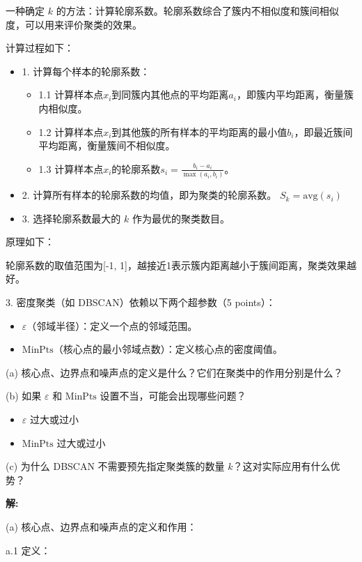 \documentclass[8pt]{article}
\begin{document}
一种确定 \( k \) 的方法：计算轮廓系数。轮廓系数综合了簇内不相似度和簇间相似度，可以用来评价聚类的效果。

计算过程如下：
\begin{itemize}
    \item 1. 计算每个样本的轮廓系数：
    \begin{itemize}
        \item 1.1 计算样本点$x_i$到同簇内其他点的平均距离$a_i$，即簇内平均距离，衡量簇内相似度。
        \item 1.2 计算样本点$x_i$到其他簇的所有样本的平均距离的最小值$b_i$，即最近簇间平均距离，衡量簇间不相似度。
        \item 1.3 计算样本点$x_i$的轮廓系数$s_i = \frac{b_i - a_i}{\max(a_i, b_i)}$。
    \end{itemize}
    \item 2. 计算所有样本的轮廓系数的均值，即为聚类的轮廓系数。
        $S_k = \text{avg}(s_i)$
    \item 3. 选择轮廓系数最大的 $k$ 作为最优的聚类数目。
\end{itemize}

原理如下：

轮廓系数的取值范围为[-1, 1]，越接近1表示簇内距离越小于簇间距离，聚类效果越好。

\vspace{3em}

3. 密度聚类（如 DBSCAN）依赖以下两个超参数（5 points）：  
\begin{itemize}
    \item \( \varepsilon \)（邻域半径）：定义一个点的邻域范围。  
    \item \( \text{MinPts} \)（核心点的最小邻域点数）：定义核心点的密度阈值。 
\end{itemize}
(a) 核心点、边界点和噪声点的定义是什么？它们在聚类中的作用分别是什么？

(b) 如果 \( \varepsilon \) 和 \( \text{MinPts} \) 设置不当，可能会出现哪些问题？  
\begin{itemize}
    \item \( \varepsilon \) 过大或过小    
    \item \( \text{MinPts} \) 过大或过小  
\end{itemize}
   
(c) 为什么 DBSCAN 不需要预先指定聚类簇的数量 \( k \)？这对实际应用有什么优势？

\textbf{\large 解:}

(a) 核心点、边界点和噪声点的定义和作用：

a.1 定义：
\end{document}
